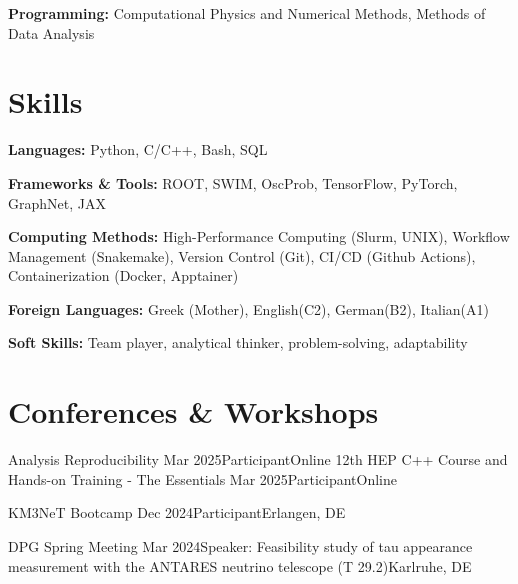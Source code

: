 \documentclass[letterpaper,11pt]{article}
\begin{document}
{{{        \textbf{Programming:}{ Computational Physics and Numerical Methods, Methods of Data Analysis}
    }}
  \resumeSubHeadingListEnd


\section{Skills}
  \vspace{2pt}
  \resumeSubHeadingListStart
    \small{\item{
        
        \textbf{Languages:}{ Python, C/C++, Bash, SQL} \\ \vspace{3pt}

        \textbf{Frameworks \& Tools:}{ ROOT, SWIM, OscProb, TensorFlow, PyTorch, GraphNet, JAX} 
        
        \textbf{Computing Methods:}{ High-Performance Computing (Slurm, UNIX), Workflow Management (Snakemake), Version Control (Git), CI/CD (Github Actions), Containerization (Docker, Apptainer)} \\ \vspace{3pt}
        
        \textbf{Foreign Languages:} {Greek (Mother), English(C2), German(B2), Italian(A1)} \\ \vspace{3pt}

        \textbf{Soft Skills:}{ Team player, analytical thinker, problem-solving, adaptability} \\ \vspace{3pt}
    }}
  \resumeSubHeadingListEnd



\section{Conferences \& Workshops}
\resumeSubHeadingListStart
      \resumeSubheading
      {Analysis Reproducibility}
      {Mar 2025}{Participant}{Online}
      \resumeSubheading
      {12th HEP C++ Course and Hands-on Training - The Essentials}
      {Mar 2025}{Participant}{Online}
      
      \resumeSubheading
      {KM3NeT Bootcamp}
      {Dec 2024}{Participant}{Erlangen, DE}
      
      \resumeSubheading
      {DPG Spring Meeting}
      {Mar 2024}{Speaker: Feasibility study of tau appearance measurement with the ANTARES neutrino telescope (T 29.2)}{Karlruhe, DE}

}
\end{document}
